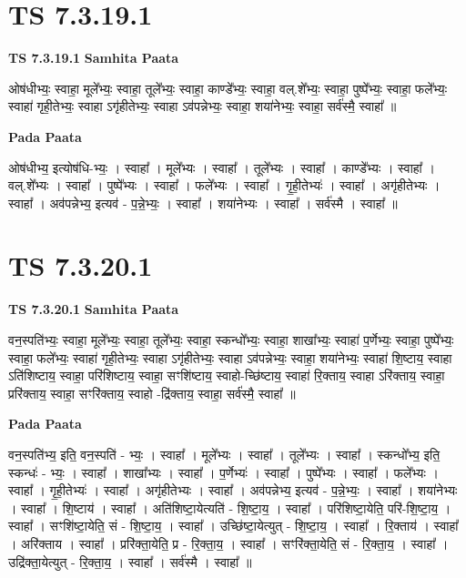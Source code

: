 \documentclass[17pt]{extarticle}
\begin{document}

\section{ TS 7.3.19.1 }

\textbf{TS 7.3.19.1 } \newline
\textbf{Samhita Paata} \newline

ओष॑धीभ्यः॒ स्वाहा॒ मूले᳚भ्यः॒ स्वाहा॒ तूले᳚भ्यः॒ स्वाहा॒ काण्डे᳚भ्यः॒ स्वाहा॒ वल्.शे᳚भ्यः॒ स्वाहा॒ पुष्पे᳚भ्यः॒ स्वाहा॒ फले᳚भ्यः॒ स्वाहा॑ गृही॒तेभ्यः॒ स्वाहा ऽगृ॑हीतेभ्यः॒ स्वाहा ऽव॑पन्नेभ्यः॒ स्वाहा॒ शया॑नेभ्यः॒ स्वाहा॒ सर्व॑स्मै॒ स्वाहा᳚ ॥ \newline

\textbf{Pada Paata} \newline

ओष॑धीभ्य॒ इत्योष॑धि-भ्यः॒ । स्वाहा᳚ । मूले᳚भ्यः । स्वाहा᳚ । तूले᳚भ्यः । स्वाहा᳚ । काण्डे᳚भ्यः । स्वाहा᳚ । वल्.शे᳚भ्यः । स्वाहा᳚ । पुष्पे᳚भ्यः । स्वाहा᳚ । फले᳚भ्यः । स्वाहा᳚ । गृ॒ही॒तेभ्यः॑ । स्वाहा᳚ । अगृ॑हीतेभ्यः । स्वाहा᳚ । अव॑पन्नेभ्य॒ इत्यव॑ - प॒न्ने॒भ्यः॒ । स्वाहा᳚ । शया॑नेभ्यः । स्वाहा᳚ । सर्व॑स्मै । स्वाहा᳚ ॥  \newline





\section{ TS 7.3.20.1 }

\textbf{TS 7.3.20.1 } \newline
\textbf{Samhita Paata} \newline

वन॒स्पति॑भ्यः॒ स्वाहा॒ मूले᳚भ्यः॒ स्वाहा॒ तूले᳚भ्यः॒ स्वाहा॒ स्कन्धो᳚भ्यः॒ स्वाहा॒ शाखा᳚भ्यः॒ स्वाहा॑ प॒र्णेभ्यः॒ स्वाहा॒ पुष्पे᳚भ्यः॒ स्वाहा॒ फले᳚भ्यः॒ स्वाहा॑ गृही॒तेभ्यः॒ स्वाहा ऽगृ॑हीतेभ्यः॒ स्वाहा ऽव॑पन्नेभ्यः॒ स्वाहा॒ शया॑नेभ्यः॒ स्वाहा॑ शि॒ष्टाय॒ स्वाहा ऽति॑शिष्टाय॒ स्वाहा॒ परि॑शिष्टाय॒ स्वाहा॒ सꣳशि॑ष्टाय॒ स्वाहो-च्छि॑ष्टाय॒ स्वाहा॑ रि॒क्ताय॒ स्वाहा ऽरि॑क्ताय॒ स्वाहा॒ प्ररि॑क्ताय॒ स्वाहा॒ सꣳरि॑क्ताय॒ स्वाहो -द्रि॑क्ताय॒ स्वाहा॒ सर्व॑स्मै॒ स्वाहा᳚ ॥ \newline

\textbf{Pada Paata} \newline

वन॒स्पति॑भ्य॒ इति॒ वन॒स्पति॑ - भ्यः॒ । स्वाहा᳚ । मूले᳚भ्यः । स्वाहा᳚ । तूले᳚भ्यः । स्वाहा᳚ । स्कन्धो᳚भ्य॒ इति॒ स्कन्धः॑ - भ्यः॒ । स्वाहा᳚ । शाखा᳚भ्यः । स्वाहा᳚ । प॒र्णेभ्यः॑ । स्वाहा᳚ । पुष्पे᳚भ्यः । स्वाहा᳚ । फले᳚भ्यः । स्वाहा᳚ । गृ॒ही॒तेभ्यः॑ । स्वाहा᳚ । अगृ॑हीतेभ्यः । स्वाहा᳚ । अव॑पन्नेभ्य॒ इत्यव॑ - प॒न्ने॒भ्यः॒ । स्वाहा᳚ । शया॑नेभ्यः । स्वाहा᳚ । शि॒ष्टाय॑ । स्वाहा᳚ । अति॑शिष्टा॒येत्यति॑ - शि॒ष्टा॒य॒ । स्वाहा᳚ । परि॑शिष्टा॒येति॒ परि॑-शि॒ष्टा॒य॒ । स्वाहा᳚ । सꣳशि॑ष्टा॒येति॒ सं - शि॒ष्टा॒य॒ । स्वाहा᳚ । उच्छि॑ष्टा॒येत्युत् - शि॒ष्टा॒य॒ । स्वाहा᳚ । रि॒क्ताय॑ । स्वाहा᳚ । अरि॑क्ताय । स्वाहा᳚ । प्ररि॑क्ता॒येति॒ प्र - रि॒क्ता॒य॒ । स्वाहा᳚ । सꣳरि॑क्ता॒येति॒ सं - रि॒क्ता॒य॒ । स्वाहा᳚ । उद्रि॑क्ता॒येत्युत् - रि॒क्ता॒य॒ । स्वाहा᳚ । सर्व॑स्मै । स्वाहा᳚ ॥  \newline
\end{document}
